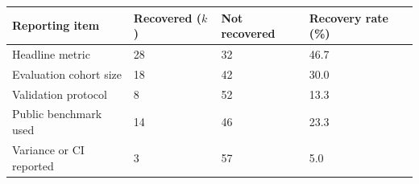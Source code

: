 \begin{tabular}{L{5.4cm} C{2.6cm} C{2.6cm} C{3.1cm}}
\toprule
\textbf{Reporting item} & \textbf{Recovered ($k$)} & \textbf{Not recovered} & \textbf{Recovery rate (\%)} \\
\midrule
Headline metric & 28 & 32 & 46.7 \\
Evaluation cohort size & 18 & 42 & 30.0 \\
Validation protocol & 8 & 52 & 13.3 \\
Public benchmark used & 14 & 46 & 23.3 \\
Variance or CI reported & 3 & 57 & 5.0 \\
\bottomrule
\end{tabular}